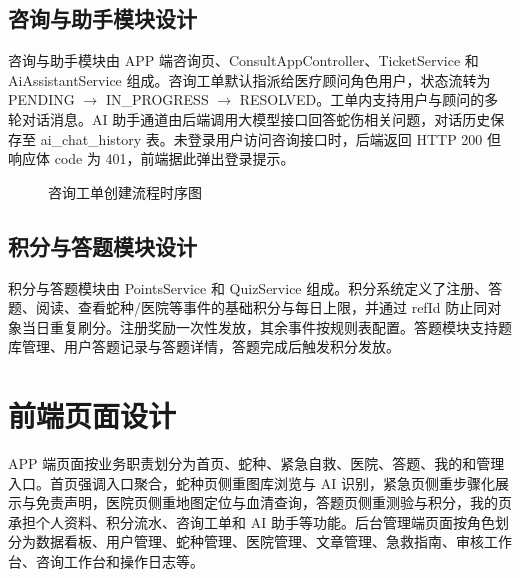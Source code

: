 \documentclass[12pt, a4paper, oneside]{ctexrep}
\begin{document}
\subsection{咨询与助手模块设计}
咨询与助手模块由 APP 端咨询页、ConsultAppController、TicketService 和 AiAssistantService 组成。咨询工单默认指派给医疗顾问角色用户，状态流转为 PENDING $\to$ IN\_PROGRESS $\to$ RESOLVED。工单内支持用户与顾问的多轮对话消息。AI 助手通道由后端调用大模型接口回答蛇伤相关问题，对话历史保存至 ai\_chat\_history 表。未登录用户访问咨询接口时，后端返回 HTTP 200 但响应体 code 为 401，前端据此弹出登录提示。

\begin{figure}[H]
\centering
{}
\caption{咨询工单创建流程时序图}
\label{fig:seq-consult-create}
\end{figure}

\subsection{积分与答题模块设计}
积分与答题模块由 PointsService 和 QuizService 组成。积分系统定义了注册、答题、阅读、查看蛇种/医院等事件的基础积分与每日上限，并通过 refId 防止同对象当日重复刷分。注册奖励一次性发放，其余事件按规则表配置。答题模块支持题库管理、用户答题记录与答题详情，答题完成后触发积分发放。

\section{前端页面设计}
APP 端页面按业务职责划分为首页、蛇种、紧急自救、医院、答题、我的和管理入口。首页强调入口聚合，蛇种页侧重图库浏览与 AI 识别，紧急页侧重步骤化展示与免责声明，医院页侧重地图定位与血清查询，答题页侧重测验与积分，我的页承担个人资料、积分流水、咨询工单和 AI 助手等功能。后台管理端页面按角色划分为数据看板、用户管理、蛇种管理、医院管理、文章管理、急救指南、审核工作台、咨询工作台和操作日志等。
\end{document}
